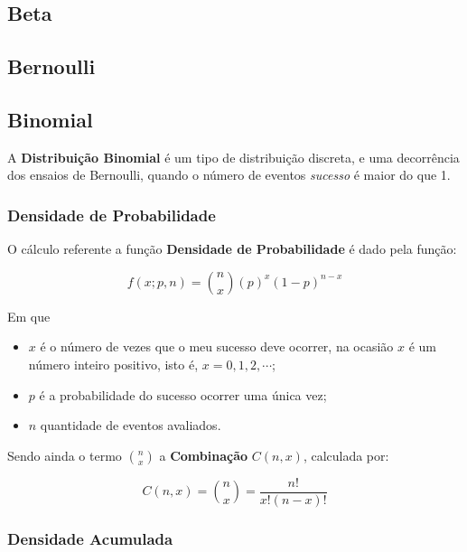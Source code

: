 \documentclass[
]{book}
\begin{document}
\hypertarget{beta}{%
\subsection{Beta}\label{beta}}

\hypertarget{bernoulli}{%
\subsection{Bernoulli}\label{bernoulli}}

\hypertarget{binomial}{%
\subsection{Binomial}\label{binomial}}

A \textbf{Distribuição Binomial} é um tipo de distribuição discreta, e uma decorrência dos ensaios de Bernoulli, quando o número de eventos \emph{sucesso} é maior do que 1.

\hypertarget{densidade-de-probabilidade-2}{%
\subsubsection*{Densidade de Probabilidade}\label{densidade-de-probabilidade-2}}

O cálculo referente a função \textbf{Densidade de Probabilidade} é dado pela função:

\begin{equation}
  f(x;p,n) = \binom{n}{x} (p)^x (1-p)^{n-x} 
\end{equation}

Em que

\begin{itemize}
\item
  \(x\) é o número de vezes que o meu sucesso deve ocorrer, na ocasião \(x\) é um número inteiro positivo, isto é, \(x = 0, 1, 2, \cdots\);
\item
  \(p\) é a probabilidade do sucesso ocorrer uma única vez;
\item
  \(n\) quantidade de eventos avaliados.
\end{itemize}

Sendo ainda o termo \(\binom{n}{x}\) a \textbf{Combinação} \(C(n,x)\), calculada por:

\[
 C(n,x) = \binom{n}{x} = \frac{n!}{x!(n-x)!}
\]

\hypertarget{densidade-acumulada-2}{%
\subsubsection*{Densidade Acumulada}\label{densidade-acumulada-2}}
\end{document}
